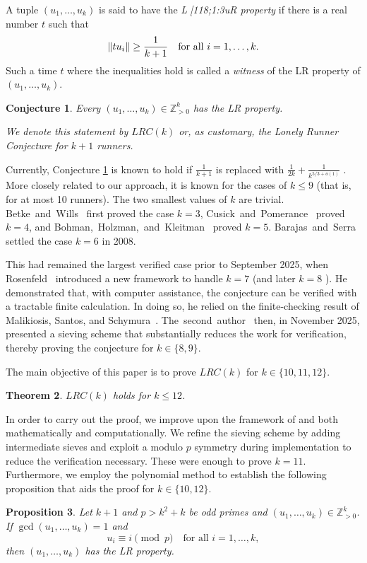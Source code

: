 \documentclass[11pt]{amsart}
\DeclarePairedDelimiter\norm{\lVert}{\rVert}
\newcommand{\Z}{\mathbb{Z}}
\newtheorem{theorem}{Theorem}[section]
\newtheorem{proposition}[theorem]{Proposition}
\newtheorem{conjecture}[theorem]{Conjecture}
\theoremstyle{definition}
\theoremstyle{remark}
\begin{document}
A tuple $(u_1, \dots, u_k)$ is said to have the \emph{L[118;1:3uR property} if there is a real number $t$ such that 
\[\norm{tu_i}\geq\frac{1}{k+1} \quad \text{for all } i = 1,\dots,k.\]
Such a time $t$ where the inequalities hold is called a \emph{witness} of the LR property of $(u_1, \dots,u_k)$.

\begin{conjecture} \label{lonelyconjred}
  Every $(u_1,\ldots,u_k)\in\Z_{>0}^k$ has the LR property.

  We denote this statement by $LRC(k)$ or, as customary, the Lonely Runner Conjecture for $k+1$ runners.
\end{conjecture}

Currently, Conjecture \ref{lonelyconjred} is known to hold if $\frac{1}{k+1}$ is replaced with
$\frac{1}{2k}+\frac{1}{k^{5/3+o(1)}}$ \cite{bedert2025riesz}.
More closely related to our approach, it is known for the cases of $k\leq9$ (that is, for at most 10 runners).
The two smallest values of $k$ are trivial. 
Betke~and~Wills~\cite{fourrunners} first proved the case $k=3$, Cusick~and~Pomerance~\cite{cusick1984view} proved $k=4$, 
and Bohman,~Holzman,~and~Kleitman~\cite{Bohman} proved $k=5$. Barajas~and~Serra~\cite{barajas_lonely_2008} 
settled the case $k=6$ in 2008.

This had remained the largest verified case prior to September 2025, when Rosenfeld~\cite{Rosenfeld} introduced a new 
framework to handle $k=7$ (and later $k=8$ \cite{rosenfeld2025lonely2}). 
He demonstrated that, with computer assistance, the conjecture can be verified with a tractable finite calculation.
In doing so, he relied on the finite-checking result of Malikiosis, Santos, and Schymura~\cite{Malikiosis}.
The~second~author~\cite{Trakulthongchai} then, in November 2025, 
presented a sieving scheme that substantially reduces the work for verification, thereby proving the conjecture for $k\in\{8,9\}$. 

The main objective of this paper is to prove $LRC(k)$ for $k\in\{10,11,12\}$.
\begin{theorem} \label{thm:main}
    $LRC(k)$ holds for $k\leq12$.
\end{theorem}

In order to carry out the proof, we improve upon the framework of \cite{Rosenfeld} and \cite{Trakulthongchai}
both mathematically and computationally. We refine the sieving scheme by adding intermediate sieves and exploit a modulo
$p$ symmetry during implementation to reduce the verification necessary. These were enough to prove $k=11$. 
Furthermore, we employ the polynomial method to establish the following proposition that aids the proof for $k\in\{10,12\}$.
\begin{proposition} \label{prop:onetokintro}
    Let $k+1$ and $p > k^2 + k$ be odd primes and $(u_1,\ldots,u_k)\in\Z_{>0}^k$.
    If $\gcd(u_1,\ldots,u_k)=1$ and 
    \[u_i\equiv i\pmod{p} \quad \text{for all } i = 1,\dots,k,\] 
    then $(u_1,\ldots,u_k)$ has the LR property.
\end{proposition}
\end{document}
